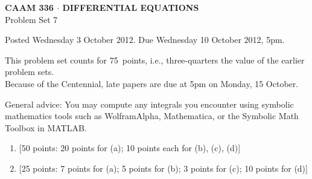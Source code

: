 \documentclass[10pt]{article}
\begin{document}

\begin{center}
\large \textsf{\textbf{CAAM 336 $\cdot$ DIFFERENTIAL EQUATIONS}\\[0.5em]
 Problem Set 7 }
\end{center}

Posted Wednesday 3 October 2012.  Due Wednesday 10 October 2012, 5pm.



\begin{center}
This problem set counts for 75~points, i.e., three-quarters the value 
of the earlier problem sets.\\
Because of the Centennial, late papers are due at 5pm on Monday, 15 October.
\end{center}

General advice: You may compute any integrals you encounter using symbolic mathematics 
tools such as WolframAlpha, Mathematica, or the Symbolic Math Toolbox in MATLAB.


\begin{enumerate}
\item {[50 points: 20 points for (a); 10 points each for (b), (c), (d)]} 



\vspace*{1em}
\item {[25 points: 7 points for (a); 5 points for (b); 3 points for (c); 10 points for (d)]}\\  
\end{enumerate}
\end{document}
